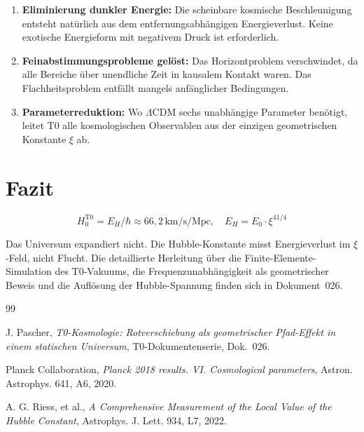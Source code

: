 	\begin{enumerate}
		\item \textbf{Eliminierung dunkler Energie:} Die scheinbare kosmische Beschleunigung entsteht natürlich aus dem entfernungsabhängigen Energieverlust. Keine exotische Energieform mit negativem Druck ist erforderlich.

		\item \textbf{Feinabstimmungsprobleme gelöst:} Das Horizontproblem verschwindet, da alle Bereiche über unendliche Zeit in kausalem Kontakt waren. Das Flachheitsproblem entfällt mangels anfänglicher Bedingungen.

		\item \textbf{Parameterreduktion:} Wo $\Lambda$CDM sechs unabhängige Parameter benötigt, leitet T0 alle kosmologischen Observablen aus der einzigen geometrischen Konstante $\xi$ ab.
	\end{enumerate}

\section{Fazit}

	\begin{equation}
		\boxed{H_0^{\text{T0}} = E_H/\hbar \approx 66{,}2\,\text{km/s/Mpc}, \quad E_H = E_0 \cdot \xi^{41/4}}
	\end{equation}

	Das Universum expandiert nicht. Die Hubble-Konstante misst Energieverlust im $\xi$-Feld, nicht Flucht. Die detaillierte Herleitung über die Finite-Elemente-Simulation des T0-Vakuums, die Frequenzunabhängigkeit als geometrischer Beweis und die Auflösung der Hubble-Spannung finden sich in Dokument~026.

	\begin{thebibliography}{99}

		J. Pascher, \textit{T0-Kosmologie: Rotverschiebung als geometrischer Pfad-Effekt in einem statischen Universum}, T0-Dokumentenserie, Dok.~026.

		Planck Collaboration, \textit{Planck 2018 results. VI. Cosmological parameters}, Astron. Astrophys. 641, A6, 2020.

		A. G. Riess, et al., \textit{A Comprehensive Measurement of the Local Value of the Hubble Constant}, Astrophys. J. Lett. 934, L7, 2022.

	\end{thebibliography}
